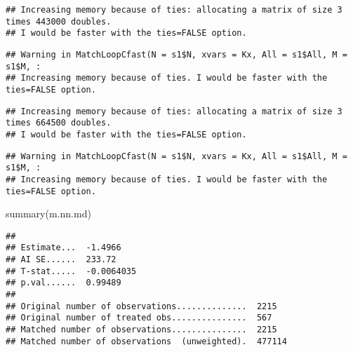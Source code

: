 \documentclass[
]{article}
\newenvironment{Shaded}{\begin{snugshade}}{\end{snugshade}}
\newcommand{\AttributeTok}[1]{\textcolor[rgb]{0.77,0.63,0.00}{#1}}
\newcommand{\DecValTok}[1]{\textcolor[rgb]{0.00,0.00,0.81}{#1}}
\newcommand{\FunctionTok}[1]{\textcolor[rgb]{0.00,0.00,0.00}{#1}}
\newcommand{\NormalTok}[1]{#1}
\newcommand{\OtherTok}[1]{\textcolor[rgb]{0.56,0.35,0.01}{#1}}
\newcommand{\SpecialCharTok}[1]{\textcolor[rgb]{0.00,0.00,0.00}{#1}}
\newcommand{\StringTok}[1]{\textcolor[rgb]{0.31,0.60,0.02}{#1}}
\begin{document}
\begin{Shaded}
\end{Shaded}

\begin{verbatim}
## Increasing memory because of ties: allocating a matrix of size 3 times 443000 doubles.
## I would be faster with the ties=FALSE option.
\end{verbatim}

\begin{verbatim}
## Warning in MatchLoopCfast(N = s1$N, xvars = Kx, All = s1$All, M = s1$M, :
## Increasing memory because of ties. I would be faster with the ties=FALSE option.
\end{verbatim}

\begin{verbatim}
## Increasing memory because of ties: allocating a matrix of size 3 times 664500 doubles.
## I would be faster with the ties=FALSE option.
\end{verbatim}

\begin{verbatim}
## Warning in MatchLoopCfast(N = s1$N, xvars = Kx, All = s1$All, M = s1$M, :
## Increasing memory because of ties. I would be faster with the ties=FALSE option.
\end{verbatim}

\begin{Shaded}
\begin{Highlighting}[]
\FunctionTok{summary}\NormalTok{(m.nn.md)}
\end{Highlighting}
\end{Shaded}

\begin{verbatim}
## 
## Estimate...  -1.4966 
## AI SE......  233.72 
## T-stat.....  -0.0064035 
## p.val......  0.99489 
## 
## Original number of observations..............  2215 
## Original number of treated obs...............  567 
## Matched number of observations...............  2215 
## Matched number of observations  (unweighted).  477114
\end{verbatim}
\end{document}
